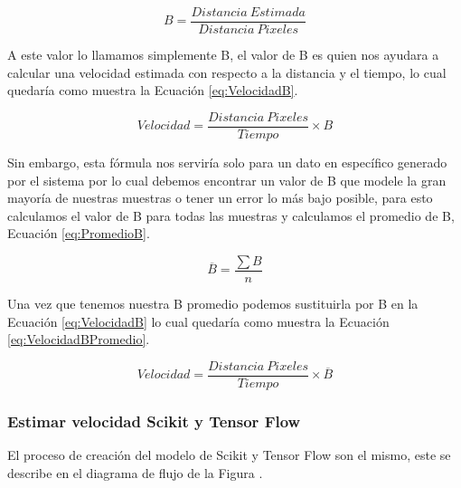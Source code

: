 \begin{equation}
    \label{eq:EcuacionB}
    B = \frac{Distancia \: Estimada}{Distancia \: Pixeles}
\end{equation}

A este valor lo llamamos simplemente B, el valor de B es quien nos ayudara a calcular una velocidad estimada con respecto a la distancia y el tiempo, lo cual quedaría como muestra la Ecuación \ref{eq:VelocidadB}.

\begin{equation}
    \label{eq:VelocidadB}
    Velocidad = \frac{Distancia \: Pixeles}{Tiempo} \times B
\end{equation}

Sin embargo, esta fórmula nos serviría solo para un dato en específico generado por el sistema por lo cual debemos encontrar un valor de B que modele la gran mayoría de nuestras muestras o tener un error lo más bajo posible, para esto calculamos el valor de B para todas las muestras y calculamos el promedio de B, Ecuación \ref{eq:PromedioB}.

\begin{equation}
    \label{eq:PromedioB}
    \overline{B} = \frac{\sum B}{n}
\end{equation}

Una vez que tenemos nuestra B promedio podemos sustituirla por B en la Ecuación \ref{eq:VelocidadB} lo cual quedaría como muestra la Ecuación \ref{eq:VelocidadBPromedio}.

\begin{equation}
    \label{eq:VelocidadBPromedio}
    Velocidad = \frac{Distancia \: Pixeles}{Tiempo} \times \overline{B}
\end{equation}



\subsubsection{Estimar velocidad Scikit y Tensor Flow}

El proceso de creación del modelo de Scikit y Tensor Flow son el mismo, este se describe en el diagrama de flujo de la Figura \label{ref:ModeloScikitTensorFlow}.

